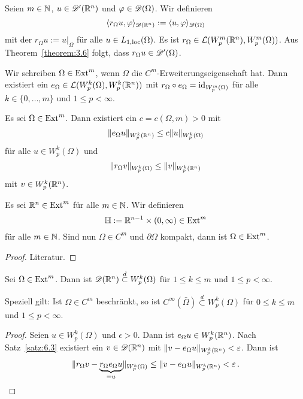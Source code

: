 \begin{defi}
  Seien $m\in\mathbb{N}$, $u\in\mathscr{D}'(\mathbb{R}^n)$ und $\varphi\in\mathscr{D}(\Omega)$. Wir definieren
  \[ \langle r_\Omega u,\varphi\rangle_{\mathscr{D}(\mathbb{R}^n)}:=\langle u,\varphi\rangle_{\mathscr{D}(\Omega)} \]
  mit der  $r_\Omega u:=u\rvert_\Omega$ für alle $u\in L_{1,\scriptsize{\textnormal{loc}}}(\Omega)$. Es ist $r_\Omega\in\mathcal{L}(W_p^m(\mathbb{R}^n),\allowbreak W_p^m(\Omega))$. Aus Theorem~\ref{theorem:3.6} folgt, dass $r_\Omega u\in\mathscr{D}'(\Omega)$.

  Wir schreiben $\Omega\in\text{Ext}^m$, wenn $\Omega$ die $C^m$-Erweiterungseigenschaft hat. Dann existiert ein $e_\Omega\in\mathcal{L}(W_p^k(\Omega),W_p^k(\mathbb{R}^n))$ mit $r_\Omega\circ e_\Omega=\text{id}_{W_p^m(\Omega)}$ für alle $k\in\{0,\ldots,m\}$ und $1\leq p<\infty$.
\end{defi}

\begin{bem}
  \label{bem:6.4} Es sei $\Omega\in\text{Ext}^m$. Dann existiert ein $c=c(\Omega,m)>0$ mit
  \[ \lVert e_\Omega u\rVert_{W_p^k(\mathbb{R}^n)}\leq c\lVert u\rVert_{W_p^k(\Omega)} \]
  für alle $u\in W_p^k(\Omega)$ und
  \[ \lVert r_\Omega v\rVert_{W_p^k(\Omega)}\leq\lVert v\rVert_{W_p^k(\mathbb{R}^n)} \]
  mit $v\in W_p^k(\mathbb{R}^n)$.
\end{bem}

\begin{theorem}
  \label{theorem:6.5}
  Es sei $\mathbb{R}^n\in\text{Ext}^m$ für alle $m\in\mathbb{N}$. Wir definieren
  \[ \mathbb{H} :=\mathbb{R}^{n-1}\times(0,\infty)\in\text{Ext}^m \]
  für alle $m\in\mathbb{N}$. Sind nun $\Omega\in C^m$ und $\partial\Omega$ kompakt, dann ist $\Omega\in\text{Ext}^m$.
\end{theorem}

\begin{proof}
  Literatur.
\end{proof}

\begin{kor}
  \label{kor:6.6} Sei $\Omega\in\text{Ext}^m$. Dann ist $\mathscr{D}(\mathbb{R}^n)\overset{d}\subset W_p^k(\Omega)$ für $1\leq k\leq m$ und $1\leq p<\infty$.

  Speziell gilt: Ist $\Omega\in C^m$ beschränkt, so ist $C^\infty(\bar\Omega)\overset{d}\subset W_p^k(\Omega)$ für $0\leq k\leq m$ und $1\leq p<\infty$.
\end{kor}

\begin{proof}
  Seien $u\in W_p^k(\Omega)$ und $\epsilon>0$. Dann ist $e_\Omega u\in W_p^k(\mathbb{R}^n)$. Nach Satz~\ref{satz:6.3} existiert ein $v\in\mathscr{D}(\mathbb{R}^n)$ mit $\lVert v-e_\Omega u\rVert_{W_p^k(\mathbb{R}^n)}<\varepsilon$. Dann ist 
  \[
  \lVert r_\Omega v-\underbrace{r_\Omega e_\Omega u}_{=u}\rVert_{W_p^k(\Omega)}\leq\lVert v-e_\Omega u\rVert_{W_p^k(\mathbb{R}^n)}<\varepsilon\, .
  \]
\end{proof}

